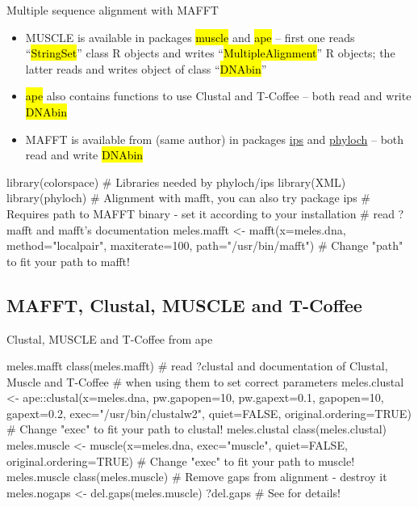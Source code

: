 \documentclass[compress, ucs, xelatex, 11pt, xcolor=svgnames,
  hyperref={
    bookmarks=true,
    unicode=true,
    colorlinks=true,
    pdftitle={Molecular data in R},
    plainpages=false,
    pdfauthor={Vojtech Zeisek},
    pdfsubject={Course about phylogeny and evolution in R},
    pdfcreator={XeLaTeX},
    pdfkeywords={R, evolution, phylogeny, molecular data},
    linkcolor=Tomato,
    anchorcolor=SaddleBrown,
    citecolor=Goldenrod,
    filecolor=DarkMagenta,
    menucolor=Sienna,
    urlcolor=DarkTurquoise,
    pdftex},
  url={hyphens, lowtilde} %
  ]{beamer}
\renewcommand{\texttt}[1]{\hl{\ttfamily #1}}
\begin{document}
\begin{frame}[fragile]{Multiple sequence alignment with MAFFT}
  \begin{itemize}
    \item MUSCLE is available in packages \texttt{muscle} and \texttt{ape} -- first one reads ``\texttt{*StringSet}'' class R objects and writes ``\texttt{*MultipleAlignment}'' R objects; the latter reads and writes object of class ``\texttt{DNAbin}''
    \item \texttt{ape} also contains functions to use Clustal and T-Coffee -- both read and write \texttt{DNAbin}
    \item MAFFT is available from (same author) in packages \href{https://CRAN.R-project.org/package=ips}{ips} and \href{http://www.christophheibl.de/Rpackages.html}{phyloch} -- both read and write \texttt{DNAbin}
  \end{itemize}
  \begin{spluscode}
    library(colorspace) # Libraries needed by phyloch/ips
    library(XML)
    library(phyloch) # Alignment with mafft, you can also try package ips
    # Requires path to MAFFT binary - set it according to your installation
    # read ?mafft and mafft's documentation
    meles.mafft <- mafft(x=meles.dna, method="localpair", maxiterate=100,
      path="/usr/bin/mafft") # Change "path" to fit your path to mafft!
  \end{spluscode}
\end{frame}

\subsection{MAFFT, Clustal, MUSCLE and T-Coffee}

\begin{frame}[fragile]{Clustal, MUSCLE and T-Coffee from ape}
  \begin{spluscode}
    meles.mafft
    class(meles.mafft)
    # read ?clustal and documentation of Clustal, Muscle and T-Coffee
    # when using them to set correct parameters
    meles.clustal <- ape::clustal(x=meles.dna, pw.gapopen=10, pw.gapext=0.1,
      gapopen=10, gapext=0.2, exec="/usr/bin/clustalw2", quiet=FALSE,
      original.ordering=TRUE) # Change "exec" to fit your path to clustal!
    meles.clustal
    class(meles.clustal)
    meles.muscle <- muscle(x=meles.dna, exec="muscle", quiet=FALSE,
      original.ordering=TRUE) # Change "exec" to fit your path to muscle!
    meles.muscle
    class(meles.muscle)
    # Remove gaps from alignment - destroy it
    meles.nogaps <- del.gaps(meles.muscle)
    ?del.gaps # See for details!
  \end{spluscode}
\end{frame}
\end{document}
